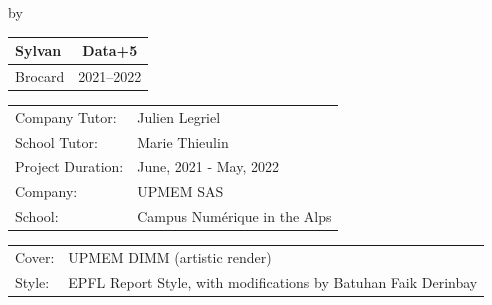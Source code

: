 \begin{titlepage}

\begin{center}

{\makeatletter
\largetitlestyle\fontsize{45}{45}\selectfont\@title
\makeatother}

{\makeatletter
\ifdefvoid{\@subtitle}{}{\bigskip\fontsize{20}{20}\selectfont\@subtitle}
\makeatother}

\bigskip
\bigskip

by

\bigskip
\bigskip

{\makeatletter
\largetitlestyle\fontsize{25}{25}\selectfont\@author
\makeatother}

\bigskip
\bigskip

\setlength\extrarowheight{2pt}
\begin{tabular}{lc}
    Sylvan & Data+5 \\\midrule
    Brocard & 2021--2022 \\
\end{tabular}

\vfill

\begin{tabular}{ll}
    Company Tutor: & Julien Legriel \\
    School Tutor: & Marie Thieulin \\
    Project Duration: & June, 2021 - May, 2022 \\
    Company: & UPMEM SAS \\
    School: & Campus Numérique in the Alps
\end{tabular}

\bigskip
\bigskip

\begin{tabular}{p{15mm}p{10cm}}
    Cover: & UPMEM DIMM (artistic render) \\
    Style: & EPFL Report Style, with modifications by Batuhan Faik Derinbay
\end{tabular}

\end{center}


\end{titlepage}
